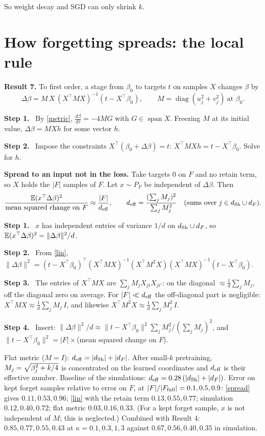 \documentclass[10pt]{article}
\newcommand{\step}[1]{\par\smallskip\textbf{Step #1.}\ }
\begin{document}
So weight decay and SGD can only shrink $k$.

\section{How forgetting spreads: the local rule}
\textbf{Result 7.} To first order, a stage from $\beta_0$ to targets $t$ on samples $X$ changes $\beta$ by
\begin{equation}\label{lin}
\Delta\beta=M\,X\,(X^\top MX)^{-1}(t-X^\top\beta_0),\qquad M=\operatorname{diag}(u_j^2+v_j^2)\ \text{at }\beta_0 .
\end{equation}
\step1 By \eqref{metric}, $\frac{d\beta}{d\tau}=-4MG$ with $G\in\operatorname{span}X$. Freezing $M$ at its initial value, $\Delta\beta=MXh$ for some vector $h$.
\step2 Impose the constraints $X^\top(\beta_0+\Delta\beta)=t$: $X^\top MXh=t-X^\top\beta_0$. Solve for $h$.

\textbf{Spread to an input not in the loss.} Take targets $0$ on $F$ and no retain term, so $X$ holds the $|F|$ samples of $F$. Let $x\sim P_F$ be independent of $\Delta\beta$. Then
\begin{equation}\label{spread}
\frac{\mathbb E(x^\top\Delta\beta)^2}{\text{mean squared change on }F}\approx\frac{|F|}{d_{\rm eff}},\qquad d_{\rm eff}=\frac{(\sum_jM_j)^2}{\sum_jM_j^2}\quad\text{(sums over }j\in d_{\rm Sh}\cup d_F).
\end{equation}
\step1 $x$ has independent entries of variance $1/d$ on $d_{\rm Sh}\cup d_F$, so $\mathbb E(x^\top\Delta\beta)^2=\|\Delta\beta\|^2/d$.
\step2 From \eqref{lin}, $\|\Delta\beta\|^2=(t-X^\top\beta_0)^\top(X^\top MX)^{-1}(X^\top M^2X)(X^\top MX)^{-1}(t-X^\top\beta_0)$.
\step3 The entries of $X^\top MX$ are $\sum_jM_jX_{ji}X_{ji'}$: on the diagonal $\approx\frac1d\sum_jM_j$, off the diagonal zero on average. For $|F|\ll d_{\rm eff}$ the off-diagonal part is negligible: $X^\top MX\approx\frac1d\sum_jM_j\,I$, and likewise $X^\top M^2X\approx\frac1d\sum_jM_j^2\,I$.
\step4 Insert: $\|\Delta\beta\|^2/d\approx\|t-X^\top\beta_0\|^2\sum_jM_j^2/(\sum_jM_j)^2$, and $\|t-X^\top\beta_0\|^2=|F|\times$(mean squared change on $F$).

Flat metric ($M=I$): $d_{\rm eff}=|d_{\rm Sh}|+|d_F|$. After small-$k$ pretraining, $M_j=\sqrt{\smash[b]{\beta_j^2}+k/4}$ is concentrated on the learned coordinates and $d_{\rm eff}$ is their effective number. Baseline of the simulations: $d_{\rm eff}=0.28\,(|d_{\rm Sh}|+|d_F|)$. Error on kept forget samples relative to error on $F$, at $|F|/|F_{\rm full}|=0.1,0.5,0.9$: \eqref{spread} gives $0.11,0.53,0.96$; \eqref{lin} with the retain term $0.13,0.55,0.77$; simulation $0.12,0.40,0.72$; flat metric $0.03,0.16,0.33$. (For a kept forget sample, $x$ is not independent of $M$; this is neglected.) Combined with Result 4: $0.85,0.77,0.55,0.43$ at $\kappa=0.1,0.3,1,3$ against $0.67,0.56,0.40,0.35$ in simulation.
\end{document}
